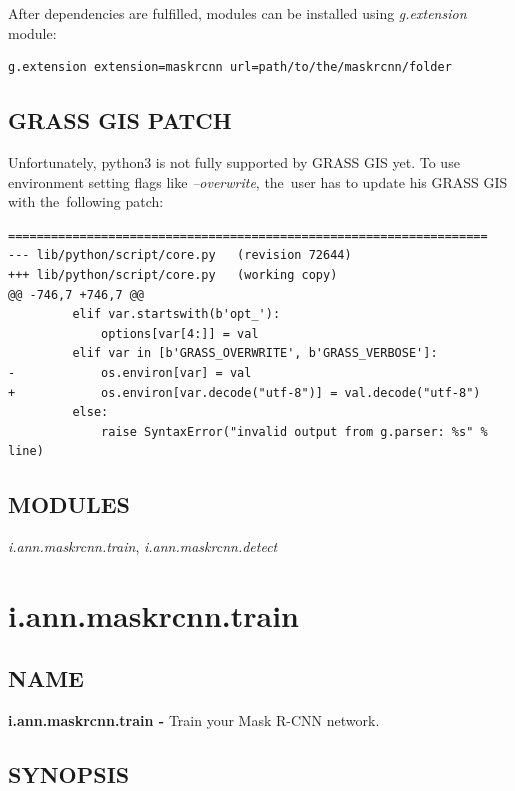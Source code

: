After dependencies are fulfilled, modules can be installed using
\emph{g.extension} module:
{\footnotesize
\begin{lstlisting}
g.extension extension=maskrcnn url=path/to/the/maskrcnn/folder
\end{lstlisting}
}


\subsection*{GRASS GIS PATCH}

Unfortunately, python3 is not fully supported by GRASS GIS yet. To use
environment setting flags like \emph{--overwrite}, the~user has to update
his GRASS GIS with the~following patch:

{\footnotesize
\begin{lstlisting}[breaklines=true]
===================================================================
--- lib/python/script/core.py	(revision 72644)
+++ lib/python/script/core.py	(working copy)
@@ -746,7 +746,7 @@
         elif var.startswith(b'opt_'):
             options[var[4:]] = val
         elif var in [b'GRASS_OVERWRITE', b'GRASS_VERBOSE']:
-            os.environ[var] = val
+            os.environ[var.decode("utf-8")] = val.decode("utf-8")
         else:
             raise SyntaxError("invalid output from g.parser: %s" % line)
\end{lstlisting}
}

\subsection*{MODULES}

\emph{i.ann.maskrcnn.train},\emph{ }\emph{i.ann.maskrcnn.detect}\emph{ }

\clearpage

\section{i.ann.maskrcnn.train}
\label{appendix-train}

\subsection*{NAME}

\textbf{i.ann.maskrcnn.train -} Train your Mask R-CNN network.

\subsection*{SYNOPSIS}

